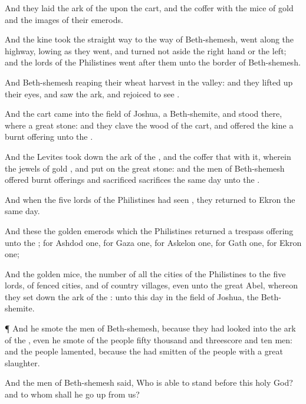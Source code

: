 {And they
laid the
ark of the
{} upon the
cart, and the
coffer with the
mice of
gold and the
images of their
emerods.

And the
kine took the
straight
way to the
way of
Beth-shemesh,
{} went
along the
highway,
lowing as they
went, and turned not
aside
{} the right
hand or
{} the
left; and the
lords of the
Philistines
went
after them unto the
border of
Beth-shemesh.

And
{}
Beth-shemesh
{}
reaping their
wheat
harvest in the
valley: and they lifted
up their
eyes, and
saw the
ark, and
rejoiced to
see
{}.

And the
cart
came into the
field of
Joshua, a
Beth-shemite, and
stood there, where
{} a
great
stone: and they
clave the
wood of the
cart, and
offered the
kine a burnt
offering unto the
{}.

And the
Levites took
down the
ark of the
{}, and the
coffer that
{} with it, wherein the
jewels of
gold
{}, and
put
{} on the
great
stone: and the
men of
Beth-shemesh
offered burnt
offerings and
sacrificed
sacrifices the same
day unto the
{}.

And when the
five
lords of the
Philistines had
seen
{}, they
returned to
Ekron the same
day.

And these
{} the
golden
emerods which the
Philistines
returned
{} a trespass
offering unto the
{}; for
Ashdod
one, for
Gaza
one, for
Askelon
one, for
Gath
one, for
Ekron
one;

And the
golden
mice,
{} the
number of all the
cities of the
Philistines
{} to the
five
lords,
{} of
fenced
cities, and of
country
villages, even unto the
great
{}
Abel, whereon they set
down the
ark of the
{}:
{} unto this
day in the
field of
Joshua, the
Beth-shemite.


\par }{\PP {}¶ And he
smote the
men of
Beth-shemesh, because they had
looked into the
ark of the
{}, even he
smote of the
people
fifty
thousand and threescore and
ten
men: and the
people
lamented, because the
{} had
smitten
{} of the
people with a
great
slaughter.

And the
men of
Beth-shemesh
said, Who is
able to
stand
before this
holy
{}
God? and to whom shall he go
up from us?


}
